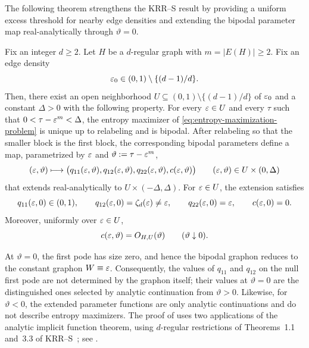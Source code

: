 The following theorem strengthens the KRR--S result by providing a uniform
excess threshold for nearby edge densities and extending the bipodal
parameter map real-analytically through $\vartheta=0$.
\begin{theorem}\label{thm:krrs-analytic-extension}
Fix an integer $d\ge2$.  Let $H$ be a $d$-regular graph with $m=|E(H)|\ge2$.
Fix an edge density
\[
  \varepsilon_0\in(0,1)\setminus\{(d-1)/d\}.
\]
Then, there exist an open neighborhood
$U\subseteq(0,1)\setminus\{(d-1)/d\}$ of $\varepsilon_0$ and a constant $\Delta>0$
with the following property.  For every $\varepsilon\in U$ and every $\tau$ such that
$0<\tau-\varepsilon^m<\Delta$, the entropy maximizer of \eqref{eq:entropy-maximization-problem}
is unique up to relabeling and is bipodal.  After relabeling so that the
smaller block is the first block, the corresponding bipodal parameters define a map,
parametrized by $\varepsilon$ and $\vartheta:=\tau-\varepsilon^m$,
\[
  (\varepsilon,\vartheta)\longmapsto
  \bigl(q_{11}(\varepsilon,\vartheta),q_{12}(\varepsilon,\vartheta),
  q_{22}(\varepsilon,\vartheta),c(\varepsilon,\vartheta)\bigr)
  \qquad
  (\varepsilon,\vartheta)\in U\times(0,\Delta)
\]
that extends real-analytically
to $U\times(-\Delta,\Delta)$.  For $\varepsilon \in U$, the extension satisfies
\[
  q_{11}(\varepsilon,0)\in(0,1),
  \qquad
  q_{12}(\varepsilon,0)=\zeta_d(\varepsilon)\ne\varepsilon,
  \qquad
  q_{22}(\varepsilon,0)=\varepsilon,
  \qquad
  c(\varepsilon,0)=0.
\]
Moreover, uniformly over $\varepsilon \in U$,
\[
  c(\varepsilon,\vartheta)=O_{H,U}(\vartheta)
  \qquad(\vartheta\downarrow0).
\]
\end{theorem}
At $\vartheta=0$, the first pode has size zero, and hence the bipodal graphon
reduces to the constant graphon $W\equiv\varepsilon$.  Consequently, the values of
$q_{11}$ and $q_{12}$ on the null first pode are not determined by the graphon
itself; their values at $\vartheta=0$ are the distinguished ones selected by
analytic continuation from $\vartheta>0$.  Likewise, for $\vartheta<0$, the
extended parameter functions are only analytic continuations and do not
describe entropy maximizers.
The proof of  uses two applications of the analytic implicit
function theorem, using $d$-regular restrictions of Theorems~1.1 and~3.3 of KRR--S~\cite{kenyon2014entropy};
see .

